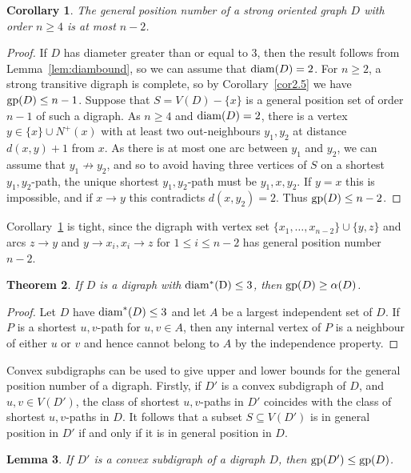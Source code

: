 \documentclass[a4paper,12pt]{article}
\newtheorem{theorem}{Theorem}[section]
\newtheorem{lemma}[theorem]{Lemma}
\newtheorem{corollary}[theorem]{Corollary}
\theoremstyle{definition}
\newcommand{\gp}{{\rm gp}}
\newcommand{\diam}{{\rm diam}}
\newcommand{\diamm}{\rm diam ^*}
\begin{document}
	\begin{corollary}\label{cor:orientedgpatmostn-2}
		The general position number of a strong oriented graph $D$ with order $n \geq 4$ is at most $n-2$.
	\end{corollary}
	\begin{proof}
		If $D$ has diameter greater than or equal to $3$, then the result follows from Lemma~\ref{lem:diambound}, so we can assume that $\diam (D) = 2$. For $n \geq 2$, a strong transitive digraph is complete, so by Corollary~\ref{cor2.5} we have $\gp (D) \leq n-1$. Suppose that $S = V(D)-\{ x\} $ is a general position set of order $n-1$ of such a digraph. As $n \geq 4$ and $\diam (D) = 2$, there is a vertex $y \in \{ x\} \cup N^+(x)$ with at least two out-neighbours $y_1,y_2$ at distance $d(x,y)+1$ from $x$. As there is at most one arc between $y_1$ and $y_2$, we can assume that $y_1 \not \rightarrow y_2$, and so to avoid having three vertices of $S$ on a shortest $y_1,y_2$-path, the unique shortest $y_1,y_2$-path must be $y_1,x,y_2$. If $y = x$ this is impossible, and if $x \rightarrow y$ this contradicts $d(x,y_2) = 2$. Thus $\gp (D) \leq n-2$.
	\end{proof}
	Corollary~\ref{cor:orientedgpatmostn-2} is tight, since the digraph with vertex set $\{ x_1,\ldots ,x_{n-2}\} \cup \{ y,z\} $ and arcs $z \rightarrow y$ and $y \rightarrow x_i , x_i \rightarrow z$ for $1 \leq i \leq n-2$ has general position number $n-2$.
	
	\begin{theorem}\label{thm:diam}
		If $D$ is a digraph with $\diamm(D) \leq 3$, then $\gp(D) \geq \alpha(D)$.
	\end{theorem}
	\begin{proof}
		Let $D$ have $\diam ^*(D) \leq 3$ and let $A$ be a largest independent set of $D$. If $P$ is a shortest $u,v$-path for $u,v \in A$, then any internal vertex of $P$ is a neighbour of either $u$ or $v$ and hence cannot belong to $A$ by the independence property.
	\end{proof}
	
	Convex subdigraphs can be used to give upper and lower bounds for the general position number of a digraph. Firstly, if $D'$ is a convex subdigraph of $D$, and $u,v \in V(D')$, the class of shortest $u,v$-paths in $D'$ coincides with the class of shortest $u,v$-paths in $D$. It follows that a subset $S \subseteq V(D')$ is in general position in $D'$ if and only if it is in general position in $D$. 
	
	\begin{lemma}\label{lem:convex}
		If $D'$ is a convex subdigraph of a digraph $D$, then $\gp(D') \leq \gp(D)$.
	\end{lemma}   
	
\end{document}
